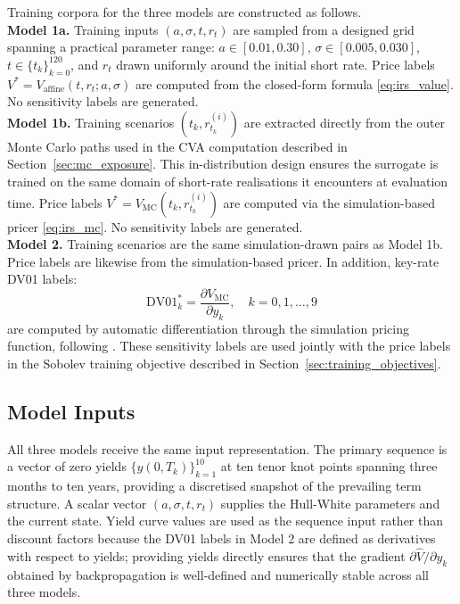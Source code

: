   Training corpora for the three models are constructed as follows. \\

  \noindent
  \textbf{Model 1a.} Training inputs $(a, \sigma, t, r_t)$ are sampled from a
  designed grid spanning a practical parameter range: $a \in [0.01, 0.30]$,
  $\sigma \in [0.005, 0.030]$, $t \in \{t_k\}_{k=0}^{120}$, and $r_t$ drawn
  uniformly around the initial short rate. Price labels
  $V^* = V_{\mathrm{affine}}(t, r_t; a, \sigma)$ are computed from the
  closed-form formula \eqref{eq:irs_value}. No sensitivity labels are generated. \\

  \noindent
  \textbf{Model 1b.} Training scenarios $(t_k, r_{t_k}^{(i)})$ are extracted
  directly from the outer Monte Carlo paths used in the CVA computation described
  in Section~\ref{sec:mc_exposure}. This in-distribution design ensures the
  surrogate is trained on the same domain of short-rate realisations it encounters
  at evaluation time. Price labels $V^* = V_{\mathrm{MC}}(t_k, r_{t_k}^{(i)})$
  are computed via the simulation-based pricer \eqref{eq:irs_mc}. No sensitivity
  labels are generated. \\

  \noindent
  \textbf{Model 2.} Training scenarios are the same simulation-drawn pairs as
  Model 1b. Price labels are likewise from the simulation-based pricer. In
  addition, key-rate DV01 labels:
  \begin{equation}
    \mathrm{DV01}_k^* = \frac{\partial V_{\mathrm{MC}}}{\partial y_k},
    \quad k = 0, 1, \ldots, 9
    \label{eq:dv01_label}
  \end{equation}
  are computed by automatic differentiation through the simulation pricing
  function, following \cite{huge2020differential}. These sensitivity labels are
  used jointly with the price labels in the Sobolev training objective described
  in Section~\ref{sec:training_objectives}.

  \subsection{Model Inputs}
  \label{sec:model_inputs}

  All three models receive the same input representation. The primary sequence is
  a vector of zero yields $\{y(0, T_k)\}_{k=1}^{10}$ at ten tenor knot points
  spanning three months to ten years, providing a discretised snapshot of the
  prevailing term structure. A scalar vector $(a, \sigma, t, r_t)$ supplies the
  Hull-White parameters and the current state. Yield curve values are used as the
  sequence input rather than discount factors because the DV01 labels in Model 2
  are defined as derivatives with respect to yields; providing yields directly
  ensures that the gradient $\partial\hat{V}/\partial y_k$ obtained by
  backpropagation is well-defined and numerically stable across all three models.

